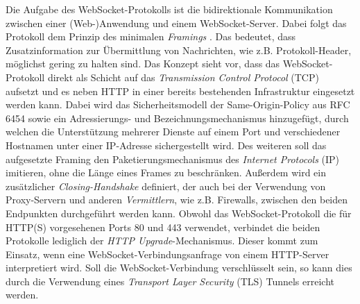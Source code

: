 \documentclass[11pt,a4paper,titlepage]{scrartcl}
\numberwithin{equation}{section}
\begin{document}
\noindent Die Aufgabe des WebSocket-Protokolls ist die bidirektionale Kommunikation zwischen einer (Web-)Anwendung und einem WebSocket-Server. Dabei folgt das Protokoll dem Prinzip des minimalen \textit{Framings} \autocite[9-10]{fette_websocket_2011}. Das bedeutet, dass Zusatzinformation zur Übermittlung von Nachrichten, wie z.B. Protokoll-Header, möglichst gering zu halten sind. Das Konzept sieht vor, dass das WebSocket-Protokoll direkt als Schicht auf das \textit{Transmission Control Protocol} (TCP) aufsetzt und es neben HTTP in einer bereits bestehenden Infrastruktur eingesetzt werden kann. Dabei wird das Sicherheitsmodell der Same-Origin-Policy aus RFC 6454 sowie ein Adressierungs- und Bezeichnungsmechanismus hinzugefügt, durch welchen die Unterstützung mehrerer Dienste auf einem Port und verschiedener Hostnamen unter einer IP-Adresse sichergestellt wird. Des weiteren soll das aufgesetzte Framing den Paketierungsmechanismus des \textit{Internet Protocols} (IP) imitieren, ohne die Länge eines Frames zu beschränken. Außerdem wird ein zusätzlicher \textit{Closing-Handshake} definiert, der auch bei der Verwendung von Proxy-Servern und anderen \textit{Vermittlern}, wie z.B. Firewalls, zwischen den beiden Endpunkten durchgeführt werden kann. Obwohl das WebSocket-Protokoll die für HTTP(S) vorgesehenen Ports 80 und 443 verwendet, verbindet die beiden Protokolle lediglich der \textit{HTTP Upgrade}-Mechanismus. Dieser kommt zum Einsatz, wenn eine WebSocket-Verbindungsanfrage von einem HTTP-Server interpretiert wird. Soll die WebSocket-Verbindung verschlüsselt sein, so kann dies durch die Verwendung eines \textit{Transport Layer Security} (TLS) Tunnels erreicht werden.
\end{document}
